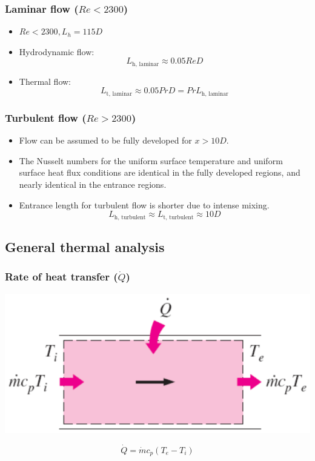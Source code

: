 \documentclass[11pt]{article}
\begin{document}
\subsubsection{Laminar flow (\(Re < 2300\))}
\label{sec:org3fe706d}
\begin{itemize}
\item \(Re < 2300, L_h = 115D\)
\item Hydrodynamic flow:
\[L_{\text{h, laminar}} \approx 0.05 Re D\]
\item Thermal flow:
\[L_{\text{t, laminar}} \approx 0.05 Pr D = Pr L_{\text{h, laminar}}\]
\end{itemize}
\subsubsection{Turbulent flow (\(Re > 2300\))}
\label{sec:org86524f7}
\begin{itemize}
\item Flow can be assumed to be fully developed for \(x > 10 D\).
\item The Nusselt numbers for the uniform surface temperature and uniform surface heat flux conditions are identical in the fully developed regions, and nearly identical in the entrance regions.
\item Entrance length for turbulent flow is shorter due to intense mixing.
\[L_{\text{h, turbulent}} \approx L_{\text{t, turbulent}} \approx 10 D\]
\end{itemize}

 \newpage
\subsection{General thermal analysis}
\label{sec:org3cbf4f9}

\subsubsection{Rate of heat transfer (\(\dot{Q}\))}
\label{sec:org28c5d5d}
\begin{center}
\includegraphics[width=.9\linewidth]{./images/general-thermal-analysis-heat-transfer-rate.png}
\end{center}
\[\dot{Q} = \dot{m} c_p (T_e - T_i)\]
\end{document}
